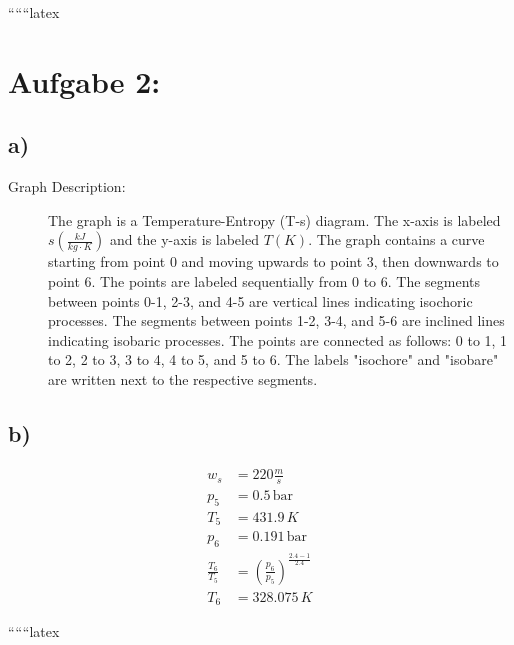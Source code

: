 
``````latex


\section*{Aufgabe 2:}

\subsection*{a)}

\begin{description}
    \item[Graph Description:] The graph is a Temperature-Entropy (T-s) diagram. The x-axis is labeled $s \left( \frac{kJ}{kg \cdot K} \right)$ and the y-axis is labeled $T \left( K \right)$. The graph contains a curve starting from point 0 and moving upwards to point 3, then downwards to point 6. The points are labeled sequentially from 0 to 6. The segments between points 0-1, 2-3, and 4-5 are vertical lines indicating isochoric processes. The segments between points 1-2, 3-4, and 5-6 are inclined lines indicating isobaric processes. The points are connected as follows: 0 to 1, 1 to 2, 2 to 3, 3 to 4, 4 to 5, and 5 to 6. The labels "isochore" and "isobare" are written next to the respective segments.
\end{description}

\subsection*{b)}

\begin{align*}
    w_s &= 220 \frac{m}{s} \\
    p_5 &= 0.5 \, \text{bar} \\
    T_5 &= 431.9 \, K \\
    p_6 &= 0.191 \, \text{bar} \\
    \frac{T_6}{T_5} &= \left( \frac{p_6}{p_5} \right)^{\frac{2.4-1}{2.4}} \\
    T_6 &= 328.075 \, K
\end{align*}

``````latex


